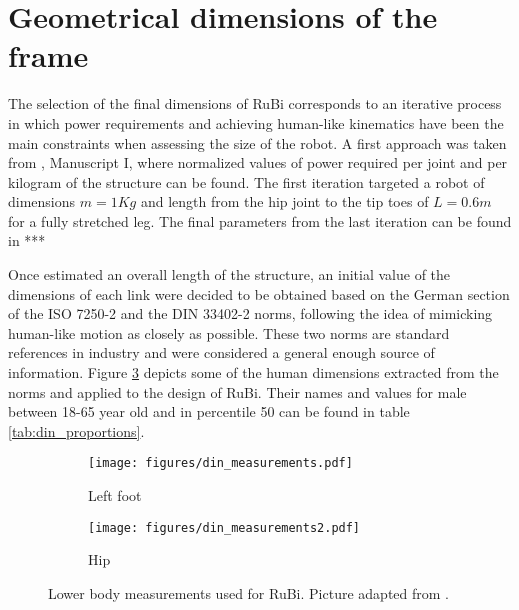 
\section{Geometrical dimensions of the frame} %
\label{sec:dimensions}
The selection of the final dimensions of RuBi corresponds to an iterative process in which power requirements and achieving human-like kinematics have been the main constraints when assessing the size of the robot.
A first approach was taken from \cite{grimmer}, Manuscript I, where normalized values of power required per joint and per kilogram of the structure can be found.
The first iteration targeted a robot of dimensions $m = 1Kg$ and length from the hip joint to the tip toes of $L = 0.6 m$ for a fully stretched leg.
The final parameters from the last iteration can be found in ***%

Once estimated an overall length of the structure, an initial value of the dimensions of each link were decided to be obtained based on the German section of the ISO 7250-2 \cite{iso_measurements} and the DIN 33402-2 \cite{din_measurements1} norms, following the idea of mimicking human-like motion as closely as possible.
These two norms are standard references in industry and were considered a general enough source of information.
Figure \ref{fig:human_measurements} depicts some of the human dimensions extracted from the norms and applied to the design of RuBi.
Their names and values for male between 18-65 year old and in percentile 50 can be found in table \ref{tab:din_proportions}.

\begin{figure}[h]
	\centering
	\begin{subfigure}[b]{0.3\textwidth}
        \texttt{[image: figures/din\_measurements.pdf]}
        \caption{Left foot}
        \label{fig:din1}
    \end{subfigure}
    \begin{subfigure}[b]{0.4\textwidth}
        \texttt{[image: figures/din\_measurements2.pdf]}
        \caption{Hip}
        \label{fig:din2}
    \end{subfigure}
	\caption{Lower body measurements used for RuBi. Picture adapted from \cite{din_measurements1}.}
	\label{fig:human_measurements}
\end{figure}


